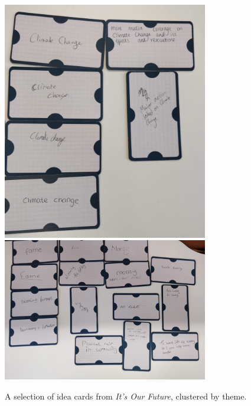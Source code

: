 \begin{figure}[hbt!]
    \centering
\includegraphics[width=0.8\textwidth]{Images/7/idea-cards-climate.jpeg}
\includegraphics[width=0.8\textwidth]{Images/7/idea-cards-money.jpeg}
  \caption{A selection of idea cards from \textit{It's Our Future}, clustered by theme.}
    \label{fig:idea-cards-eg}
\end{figure}

